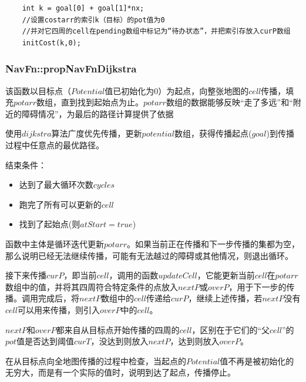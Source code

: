 \documentclass[9pt, oneside]{book}
\begin{document}
\begin{verbatim}
    int k = goal[0] + goal[1]*nx;
    //设置costarr的索引k（目标）的pot值为0
    //并对它四周的cell在pending数组中标记为“待办状态”，并把索引存放入curP数组
    initCost(k,0);
\end{verbatim}

\subsubsection{NavFn::propNavFnDijkstra}

该函数以目标点（$Potential$值已初始化为0）为起点，向整张地图的$cell$传播，填充$potarr$数组，直到找到起始点为止。$potarr$数组的数据能够反映“走了多远”和“附近的障碍情况”，为最后的路径计算提供了依据

使用$dijkstra$算法广度优先传播，更新$potential$数组，获得传播起点($goal$)到传播过程中任意点的最优路径。

结束条件：

\begin{itemize}
    \item 达到了最大循环次数$cycles$
    \item 跑完了所有可以更新的$cell$
    \item 找到了起始点(则$atStart = true$)
\end{itemize}

函数中主体是循环迭代更新$potarr$。如果当前正在传播和下一步传播的集都为空，那么说明已经无法继续传播，可能有无法越过的障碍或其他情况，则退出循环。

接下来传播$curP$，即当前$cell$，调用的函数$updateCell$，它能更新当前$cell$在$potarr$数组中的值，并将其四周符合特定条件的点放入$nextP$或$overP$，用于下一步的传播。调用完成后，将$nextP$数组中的$cell$传递给$curP$，继续上述传播，若$nextP$没有$cell$可以用来传播，则引入$overP$中的$cell$。

$nextP$和$overP$都来自从目标点开始传播的四周的$cell$，区别在于它们的“父$cell$”的$pot$值是否达到阈值$curT$，没达到则放入$nextP$，达到则放入$overP$。

在从目标点向全地图传播的过程中检查，当起点的$Potential$值不再是被初始化的无穷大，而是有一个实际的值时，说明到达了起点，传播停止。
\end{document}
